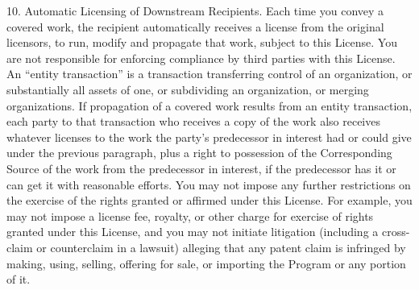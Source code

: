 \documentclass {scrbook}
\begin{document}
\begin{tiny}
10. Automatic Licensing of Downstream Recipients. Each time you convey a covered work, the recipient automatically receives a license from the original licensors, to run, modify and propagate that work, subject to this License. You are not responsible for enforcing compliance by third parties with this License. An ``entity transaction'' is a transaction transferring control of an organization, or substantially all assets of one, or subdividing an organization, or merging organizations. If propagation of a covered work results from an entity transaction, each party to that transaction who receives a copy of the work also receives whatever licenses to the work the party's predecessor in interest had or could give under the previous paragraph, plus a right to possession of the Corresponding Source of the work from the predecessor in interest, if the predecessor has it or can get it with reasonable efforts. You may not impose any further restrictions on the exercise of the rights granted or affirmed under this License. For example, you may not impose a license fee, royalty, or other charge for exercise of rights granted under this License, and you may not initiate litigation (including a cross-claim or counterclaim in a lawsuit) alleging that any patent claim is infringed by making, using, selling, offering for sale, or importing the Program or any portion of it.


\end{tiny}
\end{document}
